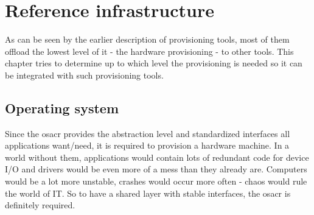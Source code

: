 
\section{Reference infrastructure}

As can be seen by the earlier description of provisioning tools, most of them offload the lowest level of it - the hardware provisioning - to other tools. This chapter tries to determine up to which level the provisioning is needed so it can be integrated with such provisioning tools.

\subsection{Operating system}
Since the \gls{osacr} provides the abstraction level and standardized interfaces all applications want/need, it is required to provision a hardware machine. In a world without them, applications would contain lots of redundant code for device I/O and drivers would be even more of a mess than they already are. Computers would be a lot more unstable, crashes would occur more often - chaos would rule the world of IT. So to have a shared layer with stable interfaces, the \gls{osacr} is definitely required.

